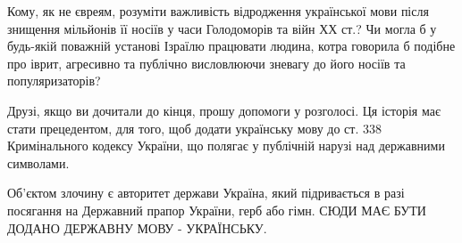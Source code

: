 Кому, як не євреям, розуміти важливість відродження української мови після
знищення мільйонів її носіїв у часи Голодоморів та війн ХХ ст.? Чи могла б у
будь-якій поважній установі Ізраїлю працювати людина, котра говорила б подібне
про іврит, агресивно та публічно висловлюючи зневагу до його носіїв та
популяризаторів? 

Друзі, якщо ви дочитали до кінця, прошу допомоги у розголосі. Ця історія має
стати прецедентом, для того, щоб додати українську мову до ст. 338
Кримінального кодексу України, що полягає у публічній нарузі над державними
символами. 

Об’єктом злочину є авторитет держави Україна, який підривається в разі
посягання на Державний прапор України, герб або гімн. СЮДИ МАЄ БУТИ ДОДАНО
ДЕРЖАВНУ МОВУ - УКРАЇНСЬКУ.


